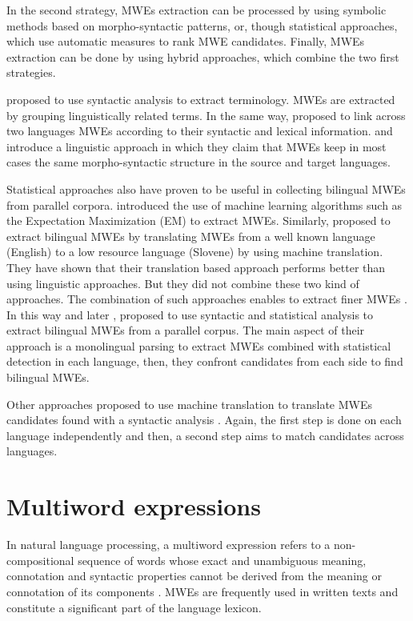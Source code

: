 \documentclass[output=paper,modfonts,nonflat]{langsci/langscibook}
\begin{document}
In the second strategy, MWEs extraction can be processed by using symbolic methods based on morpho-syntactic patterns, or, though statistical approaches, which use automatic measures to rank MWE candidates. Finally, MWEs extraction can be done by using hybrid approaches, which combine the two first strategies.

\cite{dagan1994termight} proposed to use syntactic analysis to extract terminology. MWEs are extracted by grouping linguistically related terms. In the same way, \cite{okita2010multi} proposed to link across two languages MWEs according to their syntactic and lexical information. \cite{tufis2007parallel} and \cite{seretan2007collocation} introduce a linguistic approach in which they claim that MWEs keep in most cases the same morpho-syntactic structure in the source and target languages.

Statistical approaches also have proven to be useful in collecting bilingual MWEs from parallel corpora. \cite{kupiec1993algorithm} introduced the use of machine learning algorithms such as the Expectation Maximization (EM) to extract MWEs. Similarly, \cite{vintar2008harvesting} proposed to extract bilingual MWEs by translating MWEs from a well known language (English) to a low resource language (Slovene) by using machine translation. They have shown that their translation based approach performs better than using linguistic approaches. But they did not combine these two kind of approaches. The combination of such approaches enables to extract finer MWEs \citep{daille2001extraction}. In this way \cite{wu2003bilingual} and later \cite{boulaknadel2008multiterm}, proposed to use syntactic and statistical analysis to extract bilingual MWEs from a parallel corpus. The main aspect of their approach is a monolingual parsing to extract MWEs combined with statistical detection in each language, then, they confront candidates from each side to find bilingual MWEs.

Other approaches proposed to use machine translation to translate MWEs candidates found with a syntactic analysis \citep{seretan2007collocation}. Again, the first step is done on each language independently and then, a second step aims to match candidates across languages.

\section{Multiword expressions}
In natural language processing, a multiword expression  refers to a non-composi\-tional sequence of words whose exact and unambiguous meaning, connotation and syntactic properties cannot be derived from the meaning or connotation of its components \citep{choueka1988looking,sag02}.
MWEs are frequently used in written texts and constitute a significant part of the language lexicon.
\end{document}
